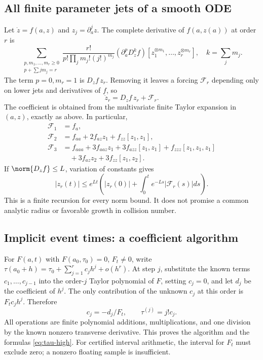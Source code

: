 \subsection{All finite parameter jets of a smooth ODE}
Let $\dot z=f(a,z)$ and $z_j=\partial_a^jz$. The complete derivative of $f(a,z(a))$ at order $r$ is
\begin{equation}
 \sum_{\substack{p,m_1,\ldots,m_r\ge0\\p+\sum jm_j=r}}
 \frac{r!}{p!\prod_jm_j!(j!)^{m_j}}
 (\partial_a^pD_z^kf)
 [z_1^{\otimes m_1},\ldots,z_r^{\otimes m_r}],
 \quad k=\sum_jm_j.
 \label{eq:ODE-jets}
\end{equation}
The term $p=0,m_r=1$ is $D_zf\,z_r$. Removing it leaves a forcing $\mathcal F_r$ depending only on lower jets and derivatives of $f$, so
\[
 \dot z_r=D_zf\,z_r+\mathcal F_r.
\]
The coefficient is obtained from the multivariate finite Taylor expansion in $(a,z)$, exactly as above. In particular,
\begin{align*}
 \mathcal F_1&=f_a,\\
 \mathcal F_2&=f_{aa}+2f_{az}z_1+f_{zz}[z_1,z_1],\\
 \mathcal F_3&=f_{aaa}+3f_{aaz}z_1+3f_{azz}[z_1,z_1]+f_{zzz}[z_1,z_1,z_1]\\
 &\quad+3f_{az}z_2+3f_{zz}[z_1,z_2].
\end{align*}
If $\norm{D_zf}\le L$, variation of constants gives
\[
 |z_r(t)|\le e^{Lt}\left(|z_r(0)|+\int_0^te^{-Ls}|\mathcal F_r(s)|ds\right).
\]
This is a finite recursion for every norm bound. It does not promise a common analytic radius or favorable growth in collision number.

\subsection{Implicit event times: a coefficient algorithm}
For $F(a,t)$ with $F(a_0,\tau_0)=0$, $F_t\ne0$, write
$\tau(a_0+h)=\tau_0+\sum_{j=1}^rc_jh^j+o(h^r)$.
At step $j$, substitute the known terms $c_1,\ldots,c_{j-1}$ into the order-$j$ Taylor polynomial of $F$, setting $c_j=0$, and let $d_j$ be the coefficient of $h^j$. The only contribution of the unknown $c_j$ at this order is $F_tc_jh^j$. Therefore
\[
 c_j=-d_j/F_t,\qquad \tau^{(j)}=j!c_j.
\]
All operations are finite polynomial additions, multiplications, and one division by the known nonzero transverse derivative. This proves the algorithm and the formulas \eqref{eq:tau-high}. For certified interval arithmetic, the interval for $F_t$ must exclude zero; a nonzero floating sample is insufficient.

